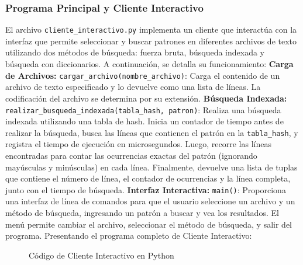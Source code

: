 \documentclass[12pt, twoside]{article}
\begin{document}
\subsubsection{Programa Principal y Cliente Interactivo}
El archivo \texttt{cliente\_interactivo.py} implementa un cliente que interactúa con la interfaz que permite seleccionar y buscar patrones en diferentes archivos de texto utilizando dos métodos de búsqueda: fuerza bruta, búsqueda indexada y búsqueda con diccionarios. A continuación, se detalla su funcionamiento:
\newline
\newline
\noindent\textbf{Carga de Archivos:}
\newline
\newline
\texttt{cargar\_archivo(nombre\_archivo)}: Carga el contenido de un archivo de texto especificado y lo devuelve como una lista de líneas. La codificación del archivo se determina por su extensión.
\newline
\newline
\noindent\textbf{Búsqueda Indexada:}
\newline
\newline
\texttt{realizar\_busqueda\_indexada(tabla\_hash, patron)}: Realiza una búsqueda indexada utilizando una tabla de hash. Inicia un contador de tiempo antes de realizar la búsqueda, busca las líneas que contienen el patrón en la \texttt{tabla\_hash}, y registra el tiempo de ejecución en microsegundos. Luego, recorre las líneas encontradas para contar las ocurrencias exactas del patrón (ignorando mayúsculas y minúsculas) en cada línea. Finalmente, devuelve una lista de tuplas que contiene el número de línea, el contador de ocurrencias y la línea completa, junto con el tiempo de búsqueda.
\newline
\newline
\noindent\textbf{Interfaz Interactiva:}
\newline
\newline
\texttt{main()}: Proporciona una interfaz de línea de comandos para que el usuario seleccione un archivo y un método de búsqueda, ingresando un patrón a buscar y vea los resultados. El menú permite cambiar el archivo, seleccionar el método de búsqueda, y salir del programa.
\newline
\newline
\newline
Presentando el programa completo de Cliente Interactivo:

\begin{figure}[H]
  \centering
  \caption{Código de Cliente Interactivo en Python}
  \label{fig:codigo-tabla-hash}
\end{figure}
\newpage
\end{document}
